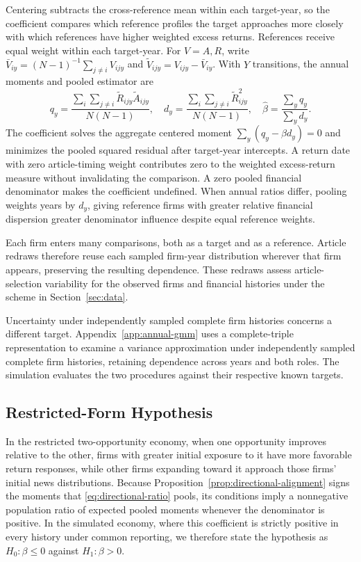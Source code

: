 Centering subtracts the cross-reference mean within each target-year,
so the coefficient compares which reference profiles the target approaches
more closely with which references have higher weighted excess returns.
References receive equal weight within each target-year.
For $V=A,R$, write $\bar V_{iy}=(N-1)^{-1}\sum_{j\ne i}V_{ijy}$ and
$\widetilde V_{ijy}=V_{ijy}-\bar V_{iy}$.
With $Y$ transitions, the annual moments and pooled estimator are
\begin{equation}\label{eq:directional-ratio}
  q_y=\frac{\sum_i\sum_{j\ne i}\widetilde R_{ijy}\widetilde A_{ijy}}{N(N-1)},\quad
  d_y=\frac{\sum_i\sum_{j\ne i}\widetilde R_{ijy}^2}{N(N-1)},\quad
  \widehat\beta=\frac{\sum_y q_y}{\sum_y d_y}.
\end{equation}
The coefficient solves the aggregate centered moment $\sum_y(q_y-\beta
d_y)=0$ and minimizes the pooled squared residual after target-year intercepts.
A return date with zero article-timing weight contributes zero to the
weighted excess-return measure without invalidating the comparison.
A zero pooled financial denominator makes the coefficient undefined.
When annual ratios differ, pooling weights years by $d_y$, giving reference
firms with greater relative financial dispersion greater denominator
influence despite equal reference weights.

Each firm enters many comparisons, both as a target and as a reference.
Article redraws therefore reuse each sampled firm-year distribution wherever
that firm appears, preserving the resulting dependence.
These redraws assess article-selection variability for the observed firms
and financial histories under the scheme in Section~\ref{sec:data}.

Uncertainty under independently sampled complete firm histories concerns a
different target.
Appendix~\ref{app:annual-gmm} uses a complete-triple representation to
examine a variance approximation under independently sampled complete firm
histories, retaining dependence across years and both roles.
The simulation evaluates the two procedures against their respective known
targets.

\subsection{Restricted-Form Hypothesis}\label{sec:hypothesis}

In the restricted two-opportunity economy, when one opportunity improves
relative to the other, firms with greater initial exposure to it have more
favorable return responses, while other firms expanding toward it approach those
firms' initial news distributions.
Because Proposition~\ref{prop:directional-alignment} signs the moments that
\eqref{eq:directional-ratio} pools, its conditions imply a nonnegative population
ratio of expected pooled moments whenever the denominator is positive.
In the simulated economy, where this coefficient is strictly positive in every
history under common reporting, we therefore state the hypothesis as
$H_0:\beta\leq0$ against $H_1:\beta>0$.

